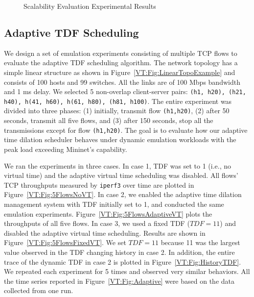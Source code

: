 \begin{figure}
\centering
\caption{Scalability Evaluation Experimental Results}
\end{figure}

\subsection{Adaptive TDF Scheduling}
We design a set of emulation experiments consisting of multiple TCP flows to evaluate the adaptive TDF scheduling algorithm.
The network topology has a simple linear structure as shown in Figure~\ref{VT:Fig:LinearTopoExample} and consists of 100 hosts and 99 switches.
All the links are of 100 Mbps bandwidth and 1 ms delay.
We selected 5 non-overlap client-server pairs: \texttt{(h1, h20), (h21, h40), h(41, h60), h(61, h80), (h81, h100)}.
The entire experiment was divided into three phases: (1) initially, transmit flow \texttt{(h1,h20)},
(2) after 50 seconds, transmit all five flows, and (3) after 150 seconds, stop all the transmissions except for flow \texttt{(h1,h20)}.
The goal is to evaluate how our adaptive time dilation scheduler behaves under dynamic emulation workloads with the peak load exceeding Mininet's capability.
 
We ran the experiments in three cases.
In case 1, TDF was set to 1 (i.e., no virtual time) and the adaptive virtual time scheduling was disabled.
All flows' TCP throughputs measured by \texttt{iperf3} over time are plotted in Figure~\ref{VT:Fig:5FlowsNoVT}. 
In case 2, we enabled the adaptive time dilation management system with TDF initially set to 1,
and conducted the same emulation experiments. Figure~\ref{VT:Fig:5FlowsAdaptiveVT} plots the throughputs of all five flows.
In case 3, we used a fixed TDF ($TDF = 11$) and disabled the adaptive virtual time scheduling.
Results are shown in Figure~\ref{VT:Fig:5FlowsFixedVT}.
We set $TDF=11$ because 11 was the largest value observed in the TDF changing history in case 2.
In addition, the entire trace of the dynamic TDF in case 2 is plotted in Figure~\ref{VT:Fig:HistoryTDF}.
We repeated each experiment for 5 times and observed very similar behaviors.
All the time series reported in Figure~\ref{VT:Fig:Adaptive} were based on the data collected from one run. 

